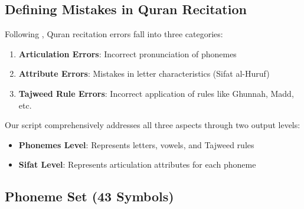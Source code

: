 \subsection{Defining Mistakes in Quran Recitation}

Following \cite{sweed2021}, Quran recitation errors fall into three categories:
\begin{enumerate}
    \item \textbf{Articulation Errors}: Incorrect pronunciation of phonemes
    \item \textbf{Attribute Errors}: Mistakes in letter characteristics (Sifat al-Huruf)
    \item \textbf{Tajweed Rule Errors}: Incorrect application of rules like Ghunnah, Madd, etc.
\end{enumerate}

Our script comprehensively addresses all three aspects through two output levels:
\begin{itemize}
    \item \textbf{Phonemes Level}: Represents letters, vowels, and Tajweed rules
    \item \textbf{Sifat Level}: Represents articulation attributes for each phoneme
\end{itemize}

\subsection{Phoneme Set (43 Symbols)}

